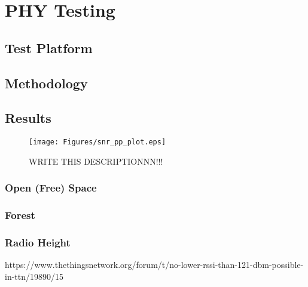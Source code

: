 \chapter{PHY Testing}
\section{Test Platform}


\section{Methodology}


\section{Results}
\the\textwidth
\begin{figure}[H]
    \centering
   	\texttt{[image: Figures/snr\_pp\_plot.eps]}
    \caption[\ac{snr} vs packet percentage plot]{
    WRITE THIS DESCRIPTIONNN!!!
    }
    \label{master_slave_sequence}
\end{figure}

\subsection{Open (Free) Space}
\subsection{Forest}
\subsection{Radio Height}

https://www.thethingsnetwork.org/forum/t/no-lower-rssi-than-121-dbm-possible-in-ttn/19890/15